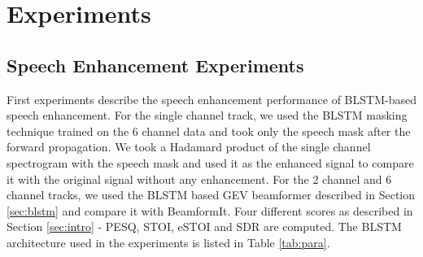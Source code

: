 \documentclass[a4paper]{article}
\begin{document}
\begin{table}[H]
  \caption{Experimental configurations}
  \label{tab:para}
  \centering
\end{table}

\section{Experiments}
\subsection{Speech Enhancement Experiments}
First experiments describe the speech enhancement performance of BLSTM-based speech enhancement.
For the single channel track, we used the BLSTM masking technique \cite{weninger2015speech} trained on the 6 channel data and took only the speech mask after the forward propagation.
We took a Hadamard product of the single channel spectrogram with the speech mask and used it as the enhanced signal to compare it with the original signal without any enhancement.
For the 2 channel and 6 channel tracks, we used the BLSTM based GEV beamformer described in Section \ref{sec:blstm} and compare it with BeamformIt. 
Four different scores as described in Section \ref{sec:intro} - PESQ, STOI, eSTOI and SDR are computed.
The BLSTM architecture used in the experiments is listed in Table \ref{tab:para}.
\end{document}
